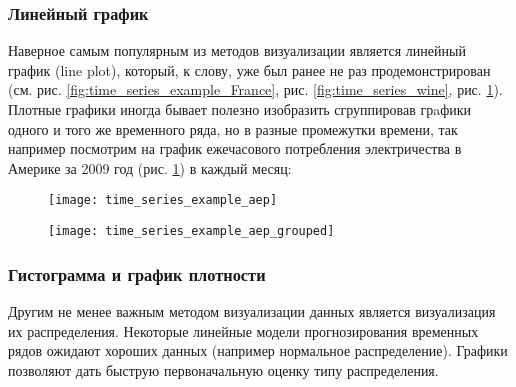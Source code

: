 \subsubsection{Линейный график}

Наверное самым популярным из методов визуализации является линейный график (line plot), 
который, к слову, уже был ранее не раз продемонстрирован 
(см. рис. \ref{fig:time_series_example_France}, рис. \ref{fig:time_series_wine}, 
рис. \ref{fig:time_series_example_aep}). \\

Плотные графики иногда бывает полезно изобразить сгруппировав 
грaфики одного и того же временного ряда, но в разные промежутки времени, так например 
посмотрим на график ежечасового потребления электричества в Америке за 2009 год 
(рис. \ref{fig:time_series_example_aep}) 
в каждый месяц:

\begin{figure}[h!]
    \centering
    \texttt{[image: time\_series\_example\_aep]}
    \label{fig:time_series_example_aep}
\end{figure}

\newpage

\begin{figure}[h!]
    \centering
    \texttt{[image: time\_series\_example\_aep\_grouped]}
    \label{fig:time_series_example_aep_grouped}
\end{figure}

\subsubsection{Гистограмма и график плотности}

Другим не менее важным методом визуализации данных является визуализация 
их распределения. 
Некоторые линейные модели прогнозирования временных рядов ожидают 
\guillemotleft хороших\guillemotright {} данных (например нормальное распределение). 
Графики позволяют дать быструю первоначальную оценку типу распределения.


